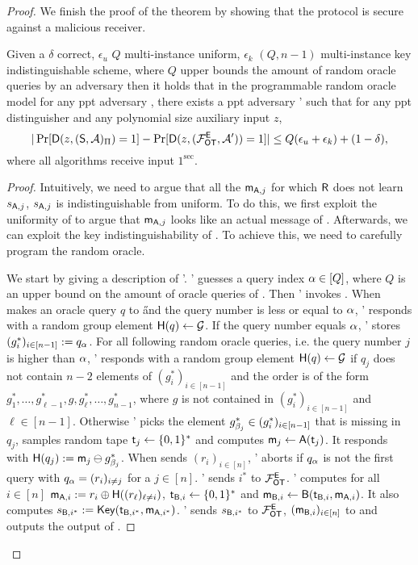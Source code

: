 \begin{proof}
We finish the proof of the theorem by showing that the \OT protocol is secure against a malicious receiver.
\begin{claim}\label{claim:malreceiver}
Given a $\delta$ correct, $\epsilon_u$ $Q$ multi-instance uniform, $\epsilon_k$ $(Q,n-1)$ multi-instance key indistinguishable  \UKA scheme, where $Q$ upper bounds the amount of random oracle queries by an adversary then it holds that in the programmable random oracle model for any ppt adversary \Adv, there exists a ppt adversary \Adv' such that for any ppt distinguisher \D and any polynomial size auxiliary input $z$,
$$
|\Pr[\mathsf D(z,(\mathsf{S}, \mathcal{A})_{\Pi})=1] -\Pr[\mathsf D(z,(\mathcal{F}_{\mathsf{OT}}^\mathsf{E},\mathcal{A}'))=1]|\leq Q(\epsilon_{u}+\epsilon_{k})+(1-\delta),
$$
where all algorithms receive input $1^\sec$.
\end{claim}


\begin{proof}
Intuitively, we need to argue that all the $\mathsf{m}_{\mathsf{A},j}$ for which $\mathsf{R}$ does not learn $s_{\mathsf{A},j}$,  $s_{\mathsf{A},j}$ is indistinguishable from uniform. To do this, we first exploit the uniformity of \UKA to argue that $\mathsf{m}_{\mathsf{A},j}$ looks like an actual message of \UKA. Afterwards, we can exploit the key indistinguishability of \UKA. To achieve this, we need to carefully program the random oracle.

We start by giving a description of \Adv'. \Adv' guesses a query index $\alpha\in[Q]$, where $Q$ is an upper bound on the amount of oracle queries of \Adv. Then \Adv'  invokes \Adv.
When \Adv makes an oracle query $q$ to \H and the query number is less or equal to $\alpha$, \Adv' responds with a random group element $\mathsf{H}(q)\leftarrow\mathcal{G}$. 
If the query number equals $\alpha$, \Adv' stores $(g^*_i)_{i\in[n-1]}:=q_{\alpha}$. 
For all following random oracle queries, i.e. the query number $j$ is higher than $\alpha$, \Adv ' responds with a random group element $\mathsf{H}(q)\leftarrow\mathcal{G}$ if $q_j$ does not contain $n-2$ elements of $(g^*_i)_{i\in[n-1]}$  and the order is of the form $g^*_1,\dots, g^*_{\ell-1},g,g^*_{\ell},\dots, g^*_{n-1}$, where $g$ is not contained in $(g^*_i)_{i\in[n-1]}$ and $\ell\in[n-1]$. Otherwise \Adv' picks the element $g^*_{\beta_j}\in(g^*_i)_{i\in[n-1]}$ that is missing in $q_j$,  samples random tape $\mathsf{t}_j\leftarrow\{0,1\}^*$ and computes $\mathsf{m}_{j}\leftarrow\mathsf{A}(\mathsf{t}_j)$. 
It responds with $\mathsf{H}(q_j):=\mathsf{m}_j\ominus g^*_{\beta_j}$. When \Adv sends $(r_i)_{i\in[n]}$, \Adv' aborts if $q_{\alpha}$ is not the first query with $q_{\alpha}=(r_i)_{i\neq j}$ for a $j\in[n]$. \Adv' sends $i^*$ to $\mathcal{F}_{\mathsf{OT}}^\mathsf{E}$. \Adv' computes for all $i\in[n]$ $\mathsf{m}_{\mathsf{A},i}:=r_i\oplus\mathsf{H}((r_\ell)_{\ell\neq i})$, $\mathsf{t}_{\mathsf{B},i}\leftarrow\{0,1\}^*$ and $\mathsf{m}_{\mathsf{B},i}\leftarrow\mathsf{B}(\mathsf{t}_{\mathsf{B},i},\mathsf{m}_{\mathsf{A},i})$. It also computes $s_{\mathsf{B},i^*}:=\mathsf{Key}(\mathsf{t}_{\mathsf{B},i^*},\mathsf{m}_{\mathsf{A},i^*})$.
\Adv' sends $s_{\mathsf{B},i^*}$ to $\mathcal{F}_{\mathsf{OT}}^\mathsf{E}$, $(\mathsf{m}_{\mathsf{B},i})_{i\in[n]}$ to \Adv and outputs the output of \Adv.


\end{proof}
\end{proof}
